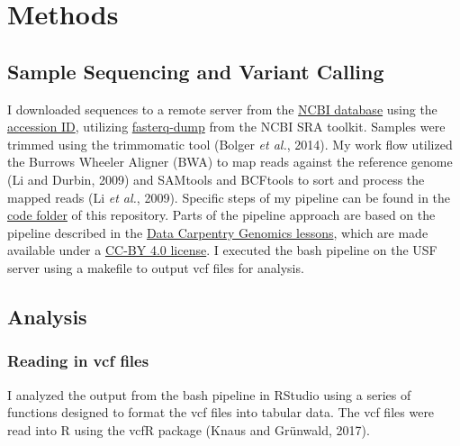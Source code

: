 \documentclass[
]{article}
\begin{document}
\hypertarget{methods}{%
\section{Methods}\label{methods}}

\hypertarget{sample-sequencing-and-variant-calling}{%
\subsection{Sample Sequencing and Variant
Calling}\label{sample-sequencing-and-variant-calling}}

I downloaded sequences to a remote server from the
\href{https://www.ncbi.nlm.nih.gov/}{NCBI database} using the
\href{https://www.ncbi.nlm.nih.gov//bioproject/PRJNA721724}{accession
ID}, utilizing
\href{https://github.com/ncbi/sra-tools/wiki/HowTo:-fasterq-dump}{fasterq-dump}
from the NCBI SRA toolkit. Samples were trimmed using the trimmomatic
tool (Bolger \emph{et al.}, 2014). My work flow utilized the Burrows
Wheeler Aligner (BWA) to map reads against the reference genome (Li and
Durbin, 2009) and SAMtools and BCFtools to sort and process the mapped
reads (Li \emph{et al.}, 2009). Specific steps of my pipeline can be
found in the
\href{https://github.com/walshmags/walshmags-bioinformatics-final-project/tree/main/code}{code
folder} of this repository. Parts of the pipeline approach are based on
the pipeline described in the
\href{https://datacarpentry.org/genomics-workshop/}{Data Carpentry
Genomics lessons}, which are made available under a
\href{https://creativecommons.org/licenses/by/4.0/}{CC-BY 4.0 license}.
I executed the bash pipeline on the USF server using a makefile to
output vcf files for analysis.

\hypertarget{analysis}{%
\subsection{Analysis}\label{analysis}}

\hypertarget{reading-in-vcf-files}{%
\subsubsection{Reading in vcf files}\label{reading-in-vcf-files}}

I analyzed the output from the bash pipeline in RStudio using a series
of functions designed to format the vcf files into tabular data. The vcf
files were read into R using the vcfR package (Knaus and Grünwald,
2017).
\end{document}
